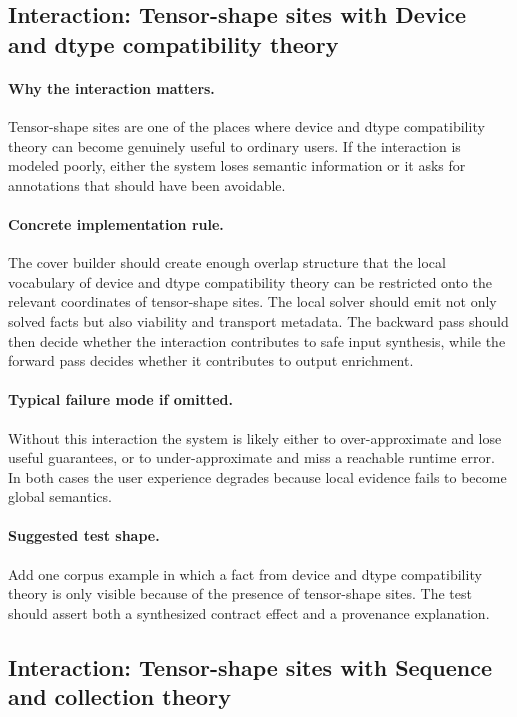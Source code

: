 \documentclass[11pt]{report}
\theoremstyle{definition}
\theoremstyle{plain}
\begin{document}
\subsection{Interaction: Tensor-shape sites with Device and dtype compatibility theory}

\paragraph{Why the interaction matters.}
Tensor-shape sites are one of the places where device and dtype compatibility theory can become
genuinely useful to ordinary users. If the interaction is modeled poorly,
either the system loses semantic information or it asks for annotations that
should have been avoidable.

\paragraph{Concrete implementation rule.}
The cover builder should create enough overlap structure that the local
vocabulary of device and dtype compatibility theory can be restricted onto the relevant
coordinates of tensor-shape sites. The local solver should emit not only
solved facts but also viability and transport metadata. The backward pass
should then decide whether the interaction contributes to safe input
synthesis, while the forward pass decides whether it contributes to output
enrichment.

\paragraph{Typical failure mode if omitted.}
Without this interaction the system is likely either to over-approximate and
lose useful guarantees, or to under-approximate and miss a reachable runtime
error. In both cases the user experience degrades because local evidence
fails to become global semantics.

\paragraph{Suggested test shape.}
Add one corpus example in which a fact from device and dtype compatibility theory is only
visible because of the presence of tensor-shape sites. The test should
assert both a synthesized contract effect and a provenance explanation.

\subsection{Interaction: Tensor-shape sites with Sequence and collection theory}
\end{document}
